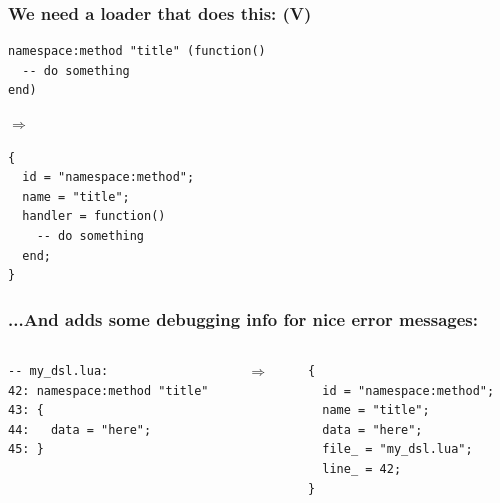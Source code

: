 \documentclass[handout]{beamer}
\begin{document}

\begin{frame}[fragile]

\frametitle{We need a loader that does this: (V)}

\begin{verbatim}
namespace:method "title" (function()
  -- do something
end)
\end{verbatim}

$\Rightarrow$

\begin{verbatim}
{
  id = "namespace:method";
  name = "title";
  handler = function()
    -- do something
  end;
}
\end{verbatim}

\end{frame}


\begin{frame}[fragile]

\frametitle{...And adds some debugging info for nice error messages:}

\begin{columns}

\begin{column}{0.5\textwidth}
\begin{verbatim}
-- my_dsl.lua:
42: namespace:method "title"
43: {
44:   data = "here";
45: }
\end{verbatim}
\end{column}

\begin{column}{0.05\textwidth}
$\Rightarrow$
\end{column}

\begin{column}{0.5\textwidth}
\begin{verbatim}
{
  id = "namespace:method";
  name = "title";
  data = "here";
  file_ = "my_dsl.lua";
  line_ = 42;
}
\end{verbatim}
\end{column}

\end{columns}

\end{frame}

\end{document}
